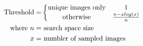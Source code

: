 \begin{equation}
\label{eq:method:threshold}
\begin{split}
\textnormal{Threshold} = & \left\{
	\begin{matrix}
	\textnormal{unique images only}& 1\\
	\textnormal{otherwise} & \tfrac{n - xlog(x)}{n}
	\end{matrix}
\right .\\
\textnormal{where } n=& \textnormal{ search space size}\\
x =& \textnormal{ numbler of sampled images}
\end{split}
\end{equation}

